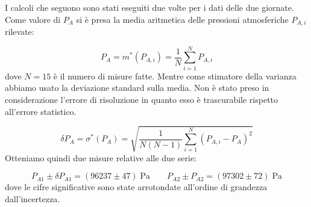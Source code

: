 I calcoli che seguono sono stati eseguiti due volte per i dati delle due giornate.
Come valore di $P_A$ si è presa la media aritmetica delle pressioni atmosferiche $P_{A,i}$ rilevate:

\begin{equation}
    P_A = m^*(P_{A,i}) = \frac{1}{N}\sum_{i=1}^N P_{A,i}
\end{equation}
%
dove $N = 15$ è il numero di misure fatte. Mentre come stimatore della varianza abbiamo usato la deviazione standard sulla media.
Non è stato preso in considerazione l'errore di risoluzione in quanto esso è trascurabile rispetto all'errore statistico. 

\begin{equation}
    \delta P_A = \sigma^*(P_{A}) = \sqrt{\frac{1}{N(N-1)}\sum_{i=1}^N (P_{A,i} - P_A)^2}
\end{equation}
%
Otteniamo quindi due misure relative alle due serie:

\begin{equation}
    P_{A1} \pm \delta P_{A1} = (96237 \pm 47) \; \si{\pascal} \qquad P_{A2} \pm P_{A2} = (97302 \pm 72) \; \si{\pascal}
    \label{eq:pa}
\end{equation}
%
dove le cifre significative sono state arrotondate all'ordine di grandezza dall'incertezza.

%
%
%
%

